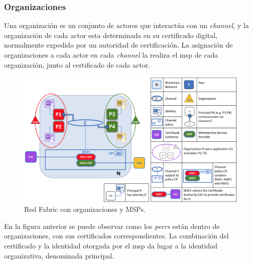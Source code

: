 \subsubsection{Organizaciones}
Una organización es un conjunto de actores que interactúa con un \textit{channel}, y la organización de cada actor esta determinada en su certificado digital, normalmente expedido por un autoridad de certificación. La asignación de organizaciones a cada actor en cada \textit{channel} la realiza el \acrshort{msp} de cada organización, junto al certificado de cada actor.
\begin{figure}[H]
\centerline{\includegraphics[scale=0.25]{recursos/orgs.png}}
\caption{Red Fabric con organizaciones y MSPs.}
\label{orgs-msp}
\end{figure}
En la figura anterior se puede observar como los \textit{peers} están dentro de organizaciones, con sus certificados correspondientes. La combinación del certificado y la identidad otorgada por el \acrshort{msp} da lugar a la identidad organizativa, denominada principal.
